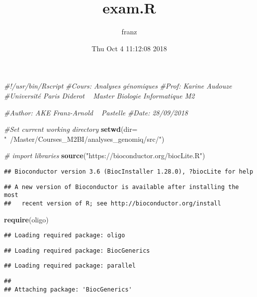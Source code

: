 \documentclass[]{article}
\title{exam.R}
\author{franz}
\date{Thu Oct 4 11:12:08 2018}
\newenvironment{Shaded}{\begin{snugshade}}{\end{snugshade}}
\newcommand{\KeywordTok}[1]{\textcolor[rgb]{0.13,0.29,0.53}{\textbf{#1}}}
\newcommand{\DataTypeTok}[1]{\textcolor[rgb]{0.13,0.29,0.53}{#1}}
\newcommand{\StringTok}[1]{\textcolor[rgb]{0.31,0.60,0.02}{#1}}
\newcommand{\CommentTok}[1]{\textcolor[rgb]{0.56,0.35,0.01}{\textit{#1}}}
\newcommand{\NormalTok}[1]{#1}
\begin{document}
\maketitle

\begin{Shaded}
\begin{Highlighting}[]
\CommentTok{#!/usr/bin/Rscript}
\CommentTok{#Cours: Analyses génomiques}
\CommentTok{#Prof: Karine Audouze }
\CommentTok{#Université Paris Diderot ~ Master Biologie Informatique M2}

\CommentTok{#Author: AKE Franz-Arnold ~ Pastelle}
\CommentTok{#Date: 28/09/2018}

\CommentTok{#Set current working directory}
\KeywordTok{setwd}\NormalTok{(}\DataTypeTok{dir=} \StringTok{"~/Master/Courses_M2BI/analyses_genomiq/src/"}\NormalTok{)}

\CommentTok{# import libraries}
\KeywordTok{source}\NormalTok{(}\StringTok{"https://bioconductor.org/biocLite.R"}\NormalTok{)}
\end{Highlighting}
\end{Shaded}

\begin{verbatim}
## Bioconductor version 3.6 (BiocInstaller 1.28.0), ?biocLite for help
\end{verbatim}

\begin{verbatim}
## A new version of Bioconductor is available after installing the most
##   recent version of R; see http://bioconductor.org/install
\end{verbatim}

\begin{Shaded}
\begin{Highlighting}[]
\KeywordTok{require}\NormalTok{(oligo)}
\end{Highlighting}
\end{Shaded}

\begin{verbatim}
## Loading required package: oligo
\end{verbatim}

\begin{verbatim}
## Loading required package: BiocGenerics
\end{verbatim}

\begin{verbatim}
## Loading required package: parallel
\end{verbatim}

\begin{verbatim}
## 
## Attaching package: 'BiocGenerics'
\end{verbatim}
\end{document}
